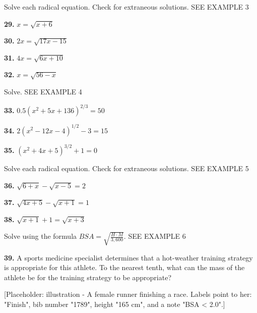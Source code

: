 \documentclass{article}
\newenvironment{practice}[2]{\noindent\textbf{#1.}}{}
\newcommand{\placeholder}[2]{[Placeholder: #1 - #2]}
\begin{document}
\begin{minipage}[t]{0.5\textwidth}
Solve each radical equation. Check for extraneous solutions. \textsc{SEE EXAMPLE 3}

\begin{practice}{29}{}
$x = \sqrt{x + 6}$
\end{practice}

\begin{practice}{30}{}
$2x = \sqrt{17x - 15}$
\end{practice}

\begin{practice}{31}{}
$4x = \sqrt{6x + 10}$
\end{practice}

\begin{practice}{32}{}
$x = \sqrt{56 - x}$
\end{practice}

Solve. \textsc{SEE EXAMPLE 4}

\begin{practice}{33}{}
$0.5(x^2 + 5x + 136)^{2/3} = 50$
\end{practice}

\begin{practice}{34}{}
$2(x^2 - 12x - 4)^{1/2} - 3 = 15$
\end{practice}

\begin{practice}{35}{}
$(x^2 + 4x + 5)^{3/2} + 1 = 0$
\end{practice}

Solve each radical equation. Check for extraneous solutions. \textsc{SEE EXAMPLE 5}

\begin{practice}{36}{}
$\sqrt{6 + x} - \sqrt{x - 5} = 2$
\end{practice}

\begin{practice}{37}{}
$\sqrt{4x + 5} - \sqrt{x + 1} = 1$
\end{practice}

\begin{practice}{38}{}
$\sqrt{x + 1} + 1 = \sqrt{x + 3}$
\end{practice}

Solve using the formula $BSA = \sqrt{\frac{H \cdot M}{3,600}}$. \textsc{SEE EXAMPLE 6}

\begin{practice}{39}{}
A sports medicine specialist determines that a hot-weather training strategy is appropriate for this athlete. To the nearest tenth, what can the mass of the athlete be for the training strategy to be appropriate?

\placeholder{illustration}{A female runner finishing a race. Labels point to her: "Finish", bib number "1789", height "165 cm", and a note "BSA < 2.0".}
\end{practice}
\end{minipage}
\end{document}
